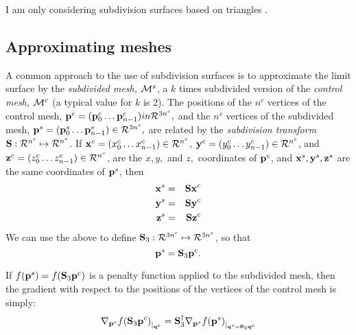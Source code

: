 I am only considering subdivision surfaces based on triangles
\cite{HoppeEtal:1994:SIGGRAPH,Hoppe:1994:Phd}.

\subsection{Approximating meshes}
\label{sec:Approximating-meshes}

A common approach to the use of subdivision surfaces is
to approximate the limit surface by the {\it subdivided mesh,} $\M^s$,
a $k$ times subdivided version of the {\it control mesh,} $\M^c$
(a typical value for $k$ is 2).
The positions of the $n^c$ vertices of the control mesh,
$\p^c = (\p^c_0 \ldots \p^c_{n-1}) \\in \Re^{3n^c},$
and the $n^s$ vertices of the subdivided mesh,
$\p^s = (\p^s_0 \ldots \p^s_{n-1}) \in \Re^{3n^s},$
are related by the {\it subdivision transform}
$\S : \Re^{n^c} \mapsto \Re^{n^s}$.
If
$\x^c = (x^c_0 \ldots x^c_{n-1}) \in \Re^{n^c}$,
$\y^c = (y^c_0 \ldots y^c_{n-1}) \in \Re^{n^c}$,
and
$\z^c = (z^c_0 \ldots z^c_{n-1}) \in \Re^{n^c}$,
are the $x, y,$ and $z,$ coordinates of $\p^c$,
and $\x^s, \y^s, \z^s$ are the same coordinates
of $\p^s$, then
\begin{eqnarray}
\x^s & = & \S \x^c
\\
\y^s & = & \S \y^c
\nonumber
\\
\z^s & = & \S \z^c
\nonumber
\end{eqnarray}
We can use the above to define $\S_3 : \Re^{3n^c} \mapsto \Re^{3n^s}$,
so that
\begin{equation}
\p^s = \S_3 \p^c.
\end{equation}


If $f(\p^s) = f(\S_3 \p^c)$ is a penalty function applied to the subdivided mesh,
then the gradient with respect to the positions of
the vertices of the control mesh is simply:
\begin{equation}
\Gc{\p^c}{f(\S_3 \p^c)}{\q^c} = \S_3^{\dagger} \Gc{\p^s}{f(\p^s)}{\q^s = \S_3 \q^c}
\end{equation}
